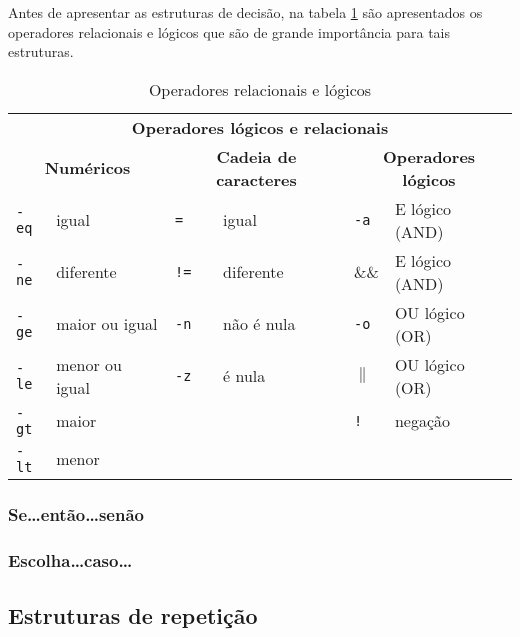 \documentclass[11pt]{../classes/ifscarticle}
\begin{document}
Antes de apresentar as estruturas de decisão, na tabela \ref{tabelaoperadores} são apresentados os operadores relacionais e lógicos que são de grande importância para tais estruturas.

\begin{table}[!htpb]
 \begin{center}
\begin{tabular}{ll||ll||ll} \toprule
\multicolumn{6}{c}{\textbf{Operadores lógicos e relacionais}} \\ 
\multicolumn{2}{c}{\textbf{Numéricos}} & \multicolumn{2}{c}{\textbf{Cadeia de caracteres}} & \multicolumn{2}{c}{\textbf{Operadores lógicos}}\\ \midrule
\texttt{-eq} & igual     & \texttt{=} & igual & \texttt{-a} & E lógico (AND) \\ \hline
\texttt{-ne} & diferente & \texttt{!=} & diferente & \&\& & E lógico (AND)\\ \hline
\texttt{-ge} & maior ou igual & \texttt{-n} & não é nula & \texttt{-o} & OU lógico (OR)\\ \hline
\texttt{-le} & menor ou igual & \texttt{-z} & é nula & $\|$ & OU lógico (OR)\\ \hline
\texttt{-gt} & maior &  & & \texttt{!} & negação \\ \hline
\texttt{-lt} & menor &  &  & &\\ \bottomrule
 \end{tabular}
 \end{center}
\caption{Operadores relacionais e lógicos}
\label{tabelaoperadores}
\end{table}


\subsubsection{Se\ldots então\ldots senão}



\subsubsection{Escolha\ldots caso\ldots}


\newpage

\subsection{Estruturas de repetição}
\end{document}
